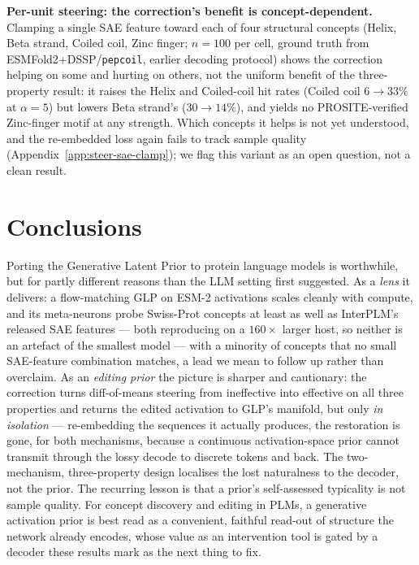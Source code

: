 \documentclass{article}
\begin{document}
\textbf{Per-unit steering: the correction's benefit is concept-dependent.} Clamping a single
SAE feature toward each of four structural concepts (Helix, Beta strand, Coiled coil, Zinc
finger; $n{=}100$ per cell, ground truth from ESMFold2+DSSP/\texttt{pepcoil}, earlier decoding
protocol) shows the correction helping on some and hurting on others, not the uniform benefit of
the three-property result: it raises the Helix and Coiled-coil hit rates (Coiled coil
$6\to33\%$ at $\alpha{=}5$) but lowers Beta strand's ($30\to14\%$), and yields no
PROSITE-verified Zinc-finger motif at any strength. Which concepts it helps is not yet
understood, and the re-embedded loss again fails to track sample quality
(Appendix~\ref{app:steer-sae-clamp}); we flag this variant as an open question, not a clean
result.

\section{Conclusions}
\label{sec:limitations}

Porting the Generative Latent Prior to protein language models is worthwhile, but for partly
different reasons than the LLM setting first suggested. As a \emph{lens} it delivers: a
flow-matching GLP on ESM-2 activations scales cleanly with compute, and its meta-neurons probe
Swiss-Prot concepts at least as well as InterPLM's released SAE features --- both reproducing on
a $160\times$ larger host, so neither is an artefact of the smallest model --- with a minority
of concepts that no small SAE-feature combination matches, a lead we mean to follow up rather
than overclaim. As an \emph{editing prior} the picture is sharper and cautionary: the correction
turns diff-of-means steering from ineffective into effective on all three properties and returns
the edited activation to GLP's manifold, but only \emph{in isolation} --- re-embedding the
sequences it actually produces, the restoration is gone, for both mechanisms, because a
continuous activation-space prior cannot transmit through the lossy decode to discrete tokens and
back. The two-mechanism, three-property design localises the lost naturalness to the decoder,
not the prior. The recurring lesson is that a prior's self-assessed typicality is not sample
quality. For concept discovery and editing in PLMs, a generative activation prior is best read as
a convenient, faithful read-out of structure the network already encodes, whose value as an
intervention tool is gated by a decoder these results mark as the next thing to fix.
\end{document}

